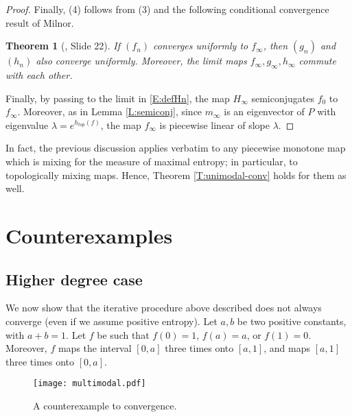\documentclass[11pt]{amsart}
\newtheorem{theorem}{Theorem}[section]
\begin{document}
\begin{proof}
\medskip
\noindent 
Finally, (4) follows from (3) and the following conditional convergence result of Milnor.

\begin{theorem}[\cite{Mil-slides}, Slide 22] \label{T:Mil-conditional}
If $(f_n)$ converges uniformly to $f_\infty$, then $(g_n)$ and $(h_n)$ also converge uniformly. 
Moreover, the limit maps $f_\infty, g_\infty, h_\infty$ commute with each other.
\end{theorem}

Finally, by passing to the limit in \eqref{E:defHn}, the map $H_\infty$ semiconjugates $f_0$ to $f_\infty$. 
Moreover, as in Lemma \ref{L:semiconj}, since $m_\infty$ is an eigenvector of $P$ with eigenvalue $\lambda = e^{h_{top}(f)}$, the map $f_\infty$ is piecewise linear of slope $\lambda$. 
\end{proof}

In fact, the previous discussion applies verbatim to any piecewise monotone map which is mixing for the measure of maximal entropy; 
in particular, to topologically mixing maps. Hence, Theorem \ref{T:unimodal-conv} holds for them as well.  

\section{Counterexamples} \label{S:counter}

\subsection{Higher degree case}
We now show that the iterative procedure above described does not always converge (even if we assume positive entropy). 
Let $a, b$ be two positive constants, with $a + b = 1$. Let $f$ be such that 
$f(0) = 1$, $f(a) = a$, or $f(1) = 0$. Moreover, $f$ maps the interval $[0, a]$ three times onto $[a, 1]$, 
and maps $[a, 1]$ three times onto $[0, a]$. 

\begin{figure}[h!]
\texttt{[image: multimodal.pdf]}
\caption{A counterexample to convergence.}
\end{figure}
\end{document}
